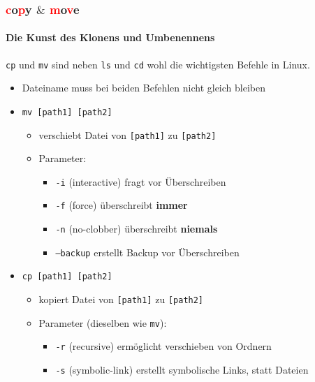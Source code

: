 \documentclass[12pt,utf8, handout]{beamer}
\begin{document}
\begin{frame}
\frametitle{\textcolor{red}{c}o\textcolor{red}{p}y $\&$ \textcolor{red}{m}o\textcolor{red}{v}e}
\framesubtitle{\textcolor{ownDarkOr}{Die Kunst des Klonens und Umbenennens}}
\texttt{cp} und \texttt{mv} sind neben \texttt{ls} und \texttt{cd} wohl die wichtigsten Befehle in Linux.
\begin{itemize}
	\item Dateiname muss bei beiden Befehlen nicht gleich bleiben
	\item \texttt{mv [path1] [path2]}
	\begin{itemize}
		\item verschiebt Datei von \texttt{[path1]} zu \texttt{[path2]}
		\item Parameter:
		\begin{itemize}[<+->]
			\item {\scriptsize \texttt{-i} (interactive) fragt vor Überschreiben}
			\item {\scriptsize \texttt{-f} (force) überschreibt \textbf{immer}}
			\item {\scriptsize \texttt{-n} (no-clobber) überschreibt \textbf{niemals}}
			\item {\scriptsize \texttt{--backup} erstellt Backup vor Überschreiben}
		\end{itemize}
	\end{itemize}
	\item \texttt{cp [path1] [path2]}
	\begin{itemize}
		\item kopiert Datei von \texttt{[path1]} zu \texttt{[path2]}
		\item Parameter {\scriptsize (dieselben wie \texttt{mv})}:
		\begin{itemize}[<+->]
			\item {\scriptsize \texttt{-r} (recursive) ermöglicht verschieben von Ordnern}
			\item {\scriptsize \texttt{-s} (symbolic-link) erstellt symbolische Links, statt Dateien}
		\end{itemize}
	\end{itemize}
\end{itemize}
\end{frame}
\end{document}
